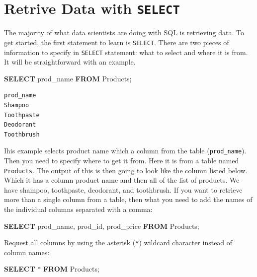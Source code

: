 \documentclass[]{book}
\makeatletter
\newenvironment{Shaded}{\begin{snugshade}}{\end{snugshade}}
\newcommand{\KeywordTok}[1]{\textcolor[rgb]{0.13,0.29,0.53}{\textbf{{#1}}}}
\newcommand{\NormalTok}[1]{{#1}}
\newenvironment{kframe}{%
\medskip{}
\setlength{\fboxsep}{.8em}
 \def\at@end@of@kframe{}%
 \ifinner\ifhmode%
  \def\at@end@of@kframe{\end{minipage}}%
  \begin{minipage}{\columnwidth}%
 \fi\fi%
 \def\FrameCommand##1{\hskip\@totalleftmargin \hskip-\fboxsep
 \colorbox{shadecolor}{##1}\hskip-\fboxsep
     \hskip-\linewidth \hskip-\@totalleftmargin \hskip\columnwidth}%
 \MakeFramed {\advance\hsize-\width
   \@totalleftmargin\z@ \linewidth\hsize
   \@setminipage}}%
 {\par\unskip\endMakeFramed%
 \at@end@of@kframe}
\renewenvironment{Shaded}{\begin{kframe}}{\end{kframe}}
\theoremstyle{definition}
\theoremstyle{definition}
\theoremstyle{remark}
\makeatother
\begin{document}
\section{\texorpdfstring{Retrive Data with
\texttt{SELECT}}{Retrive Data with SELECT}}\label{retrive-data-with-select}

The majority of what data scientists are doing with SQL is retrieving
data. To get started, the first statement to learn is \texttt{SELECT}.
There are two pieces of information to specify in \texttt{SELECT}
statement: what to select and where it is from. It will be
straightforward with an example.

\begin{Shaded}
\begin{Highlighting}[]
\KeywordTok{SELECT} \NormalTok{prod_name}
\KeywordTok{FROM} \NormalTok{Products;}
\end{Highlighting}
\end{Shaded}

\begin{verbatim}
prod_name
Shampoo
Toothpaste
Deodorant
Toothbrush
\end{verbatim}

Ihis example selects product name which a column from the table
(\texttt{prod\_name}). Then you need to specify where to get it from.
Here it is from a table named \texttt{Products}. The output of this is
then going to look like the column listed below. Which it has a column
product name and then all of the list of products. We have shampoo,
toothpaste, deodorant, and toothbrush. If you want to retrieve more than
a single column from a table, then what you need to add the names of the
individual columns separated with a comma:

\begin{Shaded}
\begin{Highlighting}[]
\KeywordTok{SELECT} \NormalTok{prod_name, prod_id, prod_price}
\KeywordTok{FROM} \NormalTok{Products;}
\end{Highlighting}
\end{Shaded}

Request all columns by using the asterisk (\texttt{*}) wildcard
character instead of column names:

\begin{Shaded}
\begin{Highlighting}[]
\KeywordTok{SELECT} \NormalTok{*}
\KeywordTok{FROM} \NormalTok{Products;}
\end{Highlighting}
\end{Shaded}
\end{document}
